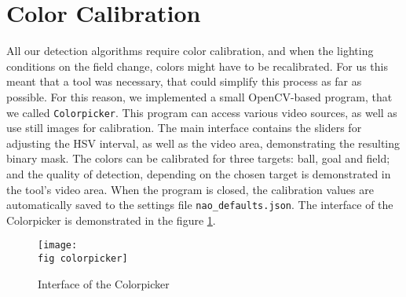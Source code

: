 \section{Color Calibration}

All our detection algorithms require color calibration, and when the lighting
conditions on the field change, colors might have to be recalibrated. For us
this meant that a tool was necessary, that could simplify this process as far
as possible. For this reason, we implemented a small OpenCV-based program, that
we called \verb|Colorpicker|. This program can access various video sources, as
well as use still images for calibration. The main interface contains the
sliders for adjusting the HSV interval, as well as the video area,
demonstrating the resulting binary mask. The colors can be calibrated for three
targets: ball, goal and field; and the quality of detection, depending on the
chosen target is demonstrated in the tool's video area. When the program is
closed, the calibration values are automatically saved to the settings file
\verb|nao_defaults.json|. The interface of the Colorpicker is demonstrated in
the figure \ref{p figure colorpicker}.

\begin{figure}[ht]
  \texttt{[image: \\fig colorpicker]}
  \caption{Interface of the Colorpicker}
  \label{p figure colorpicker}
\end{figure}
